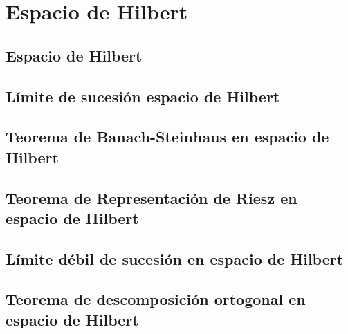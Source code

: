 \chapter{Espacio de Hilbert}

\section{Espacio de Hilbert}

\section{Límite de sucesión espacio de Hilbert}

\section{Teorema de Banach-Steinhaus en espacio de Hilbert}

\section{Teorema de Representación de Riesz en espacio de Hilbert}

\section{Límite débil de sucesión en espacio de Hilbert}

\section{Teorema de descomposición ortogonal en espacio de Hilbert}